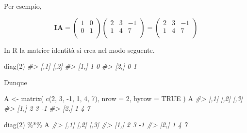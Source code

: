 \documentclass[
  11pt,
]{krantz}
\makeatletter
\newenvironment{Shaded}{\begin{snugshade}}{\end{snugshade}}
\newcommand{\AttributeTok}[1]{\textcolor[rgb]{0.61,0.61,0.61}{#1}}
\newcommand{\CommentTok}[1]{\textcolor[rgb]{0.37,0.37,0.37}{\textit{#1}}}
\newcommand{\ConstantTok}[1]{\textcolor[rgb]{0,0,0}{#1}}
\newcommand{\DecValTok}[1]{\textcolor[rgb]{0.06,0.06,0.06}{#1}}
\newcommand{\FunctionTok}[1]{\textcolor[rgb]{0,0,0}{#1}}
\newcommand{\NormalTok}[1]{#1}
\newcommand{\OtherTok}[1]{\textcolor[rgb]{0.37,0.37,0.37}{#1}}
\newcommand{\SpecialCharTok}[1]{\textcolor[rgb]{0,0,0}{#1}}
\newenvironment{kframe}{%
\medskip{}
\setlength{\fboxsep}{.8em}
 \def\at@end@of@kframe{}%
 \ifinner\ifhmode%
  \def\at@end@of@kframe{\end{minipage}}%
  \begin{minipage}{\columnwidth}%
 \fi\fi%
 \def\FrameCommand##1{\hskip\@totalleftmargin \hskip-\fboxsep
 \colorbox{shadecolor}{##1}\hskip-\fboxsep
     \hskip-\linewidth \hskip-\@totalleftmargin \hskip\columnwidth}%
 \MakeFramed {\advance\hsize-\width
   \@totalleftmargin\z@ \linewidth\hsize
   \@setminipage}}%
 {\par\unskip\endMakeFramed%
 \at@end@of@kframe}
\renewenvironment{Shaded}{\begin{kframe}}{\end{kframe}}
\theoremstyle{definition}
\theoremstyle{definition}
\theoremstyle{definition}
\theoremstyle{definition}
\theoremstyle{remark}
\makeatother
\begin{document}
Per esempio,

\[
\boldsymbol{IA} = \left(%
\begin{array}{cc}
  1 & 0 \\
  0 & 1 \\
\end{array}%
\right)
\left(%
\begin{array}{ccc}
  2 & 3 & -1 \\
  1 & 4 & 7 \\
\end{array}%
\right)=
\left(%
\begin{array}{ccc}
  2 & 3 & -1 \\
  1 & 4 & 7 \\
\end{array}%
\right)
\]

In R la matrice identità si crea nel modo seguente.

\begin{Shaded}
\begin{Highlighting}[]
\FunctionTok{diag}\NormalTok{(}\DecValTok{2}\NormalTok{)}
\CommentTok{\#\textgreater{}      [,1] [,2]}
\CommentTok{\#\textgreater{} [1,]    1    0}
\CommentTok{\#\textgreater{} [2,]    0    1}
\end{Highlighting}
\end{Shaded}

Dunque

\begin{Shaded}
\begin{Highlighting}[]
\NormalTok{A }\OtherTok{\textless{}{-}} \FunctionTok{matrix}\NormalTok{(}
  \FunctionTok{c}\NormalTok{(}\DecValTok{2}\NormalTok{, }\DecValTok{3}\NormalTok{, }\SpecialCharTok{{-}}\DecValTok{1}\NormalTok{, }\DecValTok{1}\NormalTok{, }\DecValTok{4}\NormalTok{, }\DecValTok{7}\NormalTok{),}
  \AttributeTok{nrow =} \DecValTok{2}\NormalTok{, }\AttributeTok{byrow =} \ConstantTok{TRUE}
\NormalTok{)}
\NormalTok{A}
\CommentTok{\#\textgreater{}      [,1] [,2] [,3]}
\CommentTok{\#\textgreater{} [1,]    2    3   {-}1}
\CommentTok{\#\textgreater{} [2,]    1    4    7}
\end{Highlighting}
\end{Shaded}

\begin{Shaded}
\begin{Highlighting}[]
\FunctionTok{diag}\NormalTok{(}\DecValTok{2}\NormalTok{) }\SpecialCharTok{\%*\%}\NormalTok{ A}
\CommentTok{\#\textgreater{}      [,1] [,2] [,3]}
\CommentTok{\#\textgreater{} [1,]    2    3   {-}1}
\CommentTok{\#\textgreater{} [2,]    1    4    7}
\end{Highlighting}
\end{Shaded}
\end{document}
